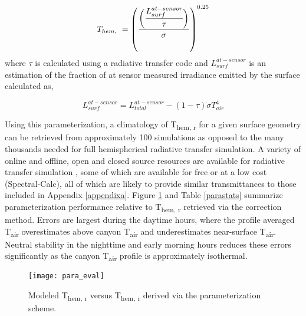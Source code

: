 \begin{bibunit}
\begin{equation}
	\label{para}
	T_{hem, ~} =\left(\displaystyle\frac{\biggl(\cfrac{\displaystyle L_{surf}^{at-sensor}}{ \displaystyle\tau}\biggr)}{ \displaystyle\sigma}\right)^{0.25}
\end{equation}
\noindent where $\tau$ is calculated using a radiative transfer code and $L_{surf}^{at-sensor}$ is an estimation of the fraction of at sensor measured irradiance emitted by the surface calculated as,

\begin{equation}
	\label{para2}
	\displaystyle L_{surf}^{at-sensor} = L_{total}^{at-sensor} - (1-\tau)\sigma T_{air}^4
\end{equation}

Using this parameterization, a climatology of T\textsubscript{hem, r} for a given surface geometry can be retrieved from approximately 100 simulations as opposed to the many thousands needed for full hemispherical radiative transfer simulation. A variety of online and offline, open and closed source resources are available for radiative transfer simulation \citep{Gastellu-Etchegorry1996,Berk1987,Buehler2005}, some of which are available for free or at a low cost (Spectral-Calc), all of which are likely to provide similar transmittances to those included in Appendix \ref{appendixa}. Figure \ref{para_eval} and Table \ref{parastats} summarize parameterization performance relative to T\textsubscript{hem, r} retrieved via the correction method. Errors are largest during the daytime hours, where the profile averaged T\textsubscript{air} overestimates above canyon T\textsubscript{air} and underestimates near-surface T\textsubscript{air}. Neutral stability in the nighttime and early morning hours reduces these errors significantly as the canyon T\textsubscript{air} profile is approximately isothermal.
 
\begin{figure}[H]
	\centering
	\texttt{[image: para\_eval]}
	\caption{Modeled T\textsubscript{hem, r} versus T\textsubscript{hem, r} derived via the parameterization scheme.}
	\label{para_eval}
\end{figure}
 

\end{bibunit}
